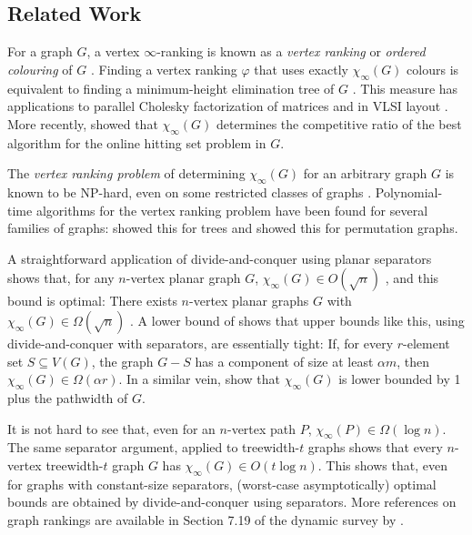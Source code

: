 \documentclass[kpfonts]{patmorin}
\theoremstyle{named}
\begin{document}
\subsection{Related Work}

For a graph $G$, a vertex $\infty$-ranking is known as a \emph{vertex ranking} \cite{bodlaender.deogun.ea:rankings} or \emph{ordered colouring} of $G$ \cite{katchalski.mccuaig.ea:ordered}.  Finding a vertex ranking $\varphi$ that uses exactly $\chi_\infty(G)$ colours is equivalent to finding a minimum-height elimination tree of $G$ \cite{torre.greenlaw.ea:optimal,deogun.kloks.ea:on}.  This measure has applications to parallel Cholesky factorization of matrices \cite{bodlaender.gilbert.ea:approximating,duff.reid:multifrontal,liu:role,dereniowski.kubale:cholesky} and in VLSI layout \cite{leiserson:area,sen.deng.ea:on}.  More recently, \citet{even.smorodinsky:hitting} showed that $\chi_\infty(G)$ determines the competitive ratio of the best algorithm for the online hitting set problem in $G$.

The \emph{vertex ranking problem} of determining $\chi_\infty(G)$ for an arbitrary graph $G$ is known to be NP-hard, even on some restricted classes of graphs \cite{bodlaender.deogun.ea:rankings,llewellyn.tovey.ea:local,llewellyn.tovey.ea:erratum,dereniowski.nadolski:vertex}. Polynomial-time algorithms for the vertex ranking problem have been found for several families of graphs: \citet{schaeffer:optimal} showed this for trees and \citet{deogun.kloks.ea:on} showed this for permutation graphs.

A straightforward application of divide-and-conquer using planar separators shows that, for any $n$-vertex planar graph $G$, $\chi_\infty(G) \in O(\sqrt{n})$ \cite{llewellyn.tovey.ea:local,katchalski.mccuaig.ea:ordered}, and this bound is optimal:  There exists $n$-vertex planar graphs $G$ with $\chi_\infty(G)\in \Omega(\sqrt{n})$ \cite{katchalski.mccuaig.ea:ordered}.  A lower bound of \citet{katchalski.mccuaig.ea:ordered} shows that upper bounds like this, using divide-and-conquer with separators, are essentially tight: If, for every $r$-element set $S\subseteq V(G)$, the graph $G-S$ has a component of size at least $\alpha m$, then $\chi_\infty(G) \in\Omega(\alpha r)$. In a similar vein, \citet{bodlaender.gilbert.ea:approximating,kloks:treewidth} show that $\chi_\infty(G)$ is lower bounded by 1 plus the pathwidth of $G$.

It is not hard to see that, even for an $n$-vertex path $P$, $\chi_\infty(P)\in\Omega(\log n)$.  The same separator argument, applied to treewidth-$t$ graphs shows that every $n$-vertex treewidth-$t$ graph $G$ has $\chi_\infty(G)\in O(t\log n)$.  This shows that, even for graphs with constant-size separators, (worst-case asymptotically) optimal bounds are obtained by divide-and-conquer using separators.  More references on graph rankings are available in Section 7.19 of the dynamic survey by \citet{gallian:dynamic}.
\end{document}
